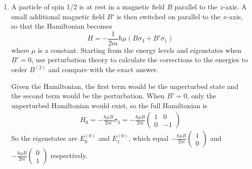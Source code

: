 \documentclass[10pt,letterpaper]{article}
\begin{document}
\begin{enumerate}
\begin{gather*}
= \frac{e^{2}\mathcal{E}^{2}\frac{\hbar}{2m\omega}n}{\hbar\omega} + \frac{e^{2}\mathcal{E}^{2}\frac{\hbar}{2m\omega}(n + 1)}{-\hbar\omega} = \frac{e^{2}\mathcal{E}^{2}}{2m\omega^{2}}(n - n - 1) = -\frac{e^{2}\mathcal{E}^{2}}{2m\omega^{2}}
\end{gather*}
The exact Hamiltonian is
\begin{gather*}
H = H_{n}^{(0)} + H' = \frac{p^{2}}{2m} + \frac{1}{2}m\omega^{2}x^{2} - e\mathcal{E}x = \frac{p^{2}}{2m} + \frac{1}{2}m\omega^{2} \left( x^{2} - \frac{2e\mathcal{E}}{m\omega^{2}}x \right) \\
= \frac{p^{2}}{2m} + \frac{1}{2}m\omega^{2} \left( x^{2} - \frac{2e\mathcal{E}}{m\omega^{2}}x + \left( \frac{e\mathcal{E}}{m\omega^{2}} \right)^{2} - \left( \frac{e\mathcal{E}}{m\omega^{2}} \right)^{2} \right) =  \frac{p^{2}}{2m} + \frac{1}{2}m\omega^{2} \left( x - \frac{e\mathcal{E}}{m\omega^{2}} \right)^{2} - \frac{e^{2}\mathcal{E}^{2}}{2m\omega^{2}}
\end{gather*}
which is the same as the perturbed Hamiltonian. The energy of both would be
\begin{gather*}
E_{n} = \left( n + \frac{1}{2} \right)\hbar\omega - \frac{e^{2}\mathcal{E}^{2}}{2m\omega^{2}}
\end{gather*}
\color{black}

\item A particle of spin 1/2 is at rest in a magnetic field $B$ parallel to the $z$-axis. A small additional magnetic field $B'$ is then switched on parallel to the $x$-axis, so that the Hamiltonian becomes
$$H = -\frac{1}{2m}\hbar\mu(B\sigma_{3} + B'\sigma_{1})$$
where $\mu$ is a constant. Starting from the energy levels and eigenstates when $B' = 0$, use perturbation theory to calculate the corrections to the energies to order $B^{(2)}$ and compare with the exact answer.

\color{violet}
Given the Hamiltonian, the first term would be the unperturbed state and the second term would be the perturbation. When $B' = 0$, only the unperturbed Hamiltonian would exist, so the full Hamiltonian is
\begin{gather*}
H_{0} = -\frac{\hbar\mu B}{2m}\sigma_{3} = -\frac{\hbar\mu B}{2m}\begin{pmatrix}
1 & 0 \\
0 & -1
\end{pmatrix}
\end{gather*}
So the eigenstates are $E_{0}^{(0)}$ and $E_{1}^{(0)}$, which equal $-\frac{\hbar\mu B}{2m} \begin{pmatrix}
1 \\
0
\end{pmatrix}$ and $-\frac{\hbar\mu B}{2m} \begin{pmatrix}
0 \\
1
\end{pmatrix}$ respectively. 
\color{black}


\end{enumerate}
\end{document}
